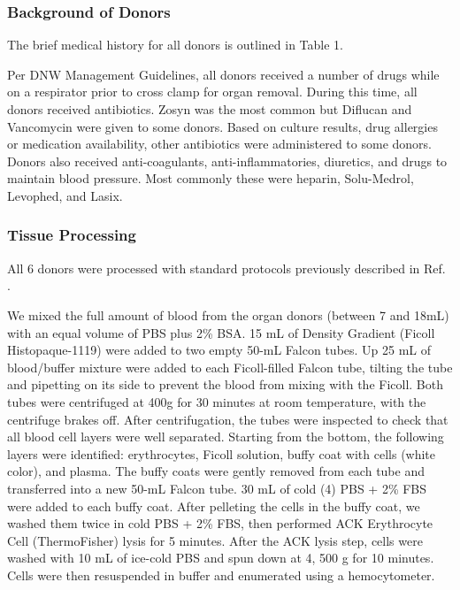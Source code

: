 \subsubsection{Background of Donors}
\noindent The brief medical history for all donors is outlined in Table 1.

Per DNW Management Guidelines, all donors received a number of drugs while on a respirator prior to cross clamp for organ removal. During this time, all donors received antibiotics. Zosyn was the most common but Diflucan and Vancomycin were given to some donors. Based on culture results, drug allergies or medication availability, other antibiotics were administered to some donors. Donors also received anti-coagulants, anti-inflammatories, diuretics, and drugs to maintain blood pressure. Most commonly these were heparin, Solu-Medrol, Levophed, and Lasix.

\subsubsection{Tissue Processing}
\label{sec:tissue-processing}
\noindent All 6 donors were processed with standard protocols previously described in Ref. \cite{tabula2022tabula}. 

 We mixed  the full amount of blood from the organ donors (between 7 and 18mL) with an equal volume of  PBS plus 2\% BSA. 15 mL of Density Gradient (Ficoll Histopaque-1119) were added to two empty 50-mL Falcon tubes. Up 25 mL of blood/buffer mixture were added to each Ficoll-filled Falcon tube, tilting the tube and pipetting on its side to prevent the blood from mixing with the Ficoll. Both tubes were centrifuged at 400g for 30 minutes at room temperature, with the centrifuge brakes off. After centrifugation, the tubes were inspected to check that all blood cell layers were well separated. Starting from the bottom, the following layers were identified: erythrocytes, Ficoll solution, buffy coat with cells (white color), and plasma. The buffy coats were gently removed from each tube and transferred into a new 50-mL Falcon tube. 30 mL of cold (4\celsius) PBS + 2\% FBS were added to each buffy coat. After pelleting the cells in the buffy coat, we washed them twice in cold PBS + 2\% FBS, then performed ACK Erythrocyte Cell (ThermoFisher) lysis for 5 minutes. After the ACK lysis step, cells were washed with 10 mL of ice-cold PBS and spun down at 4\celsius, 500 g for 10 minutes. Cells were then resuspended in buffer and enumerated using a hemocytometer.

